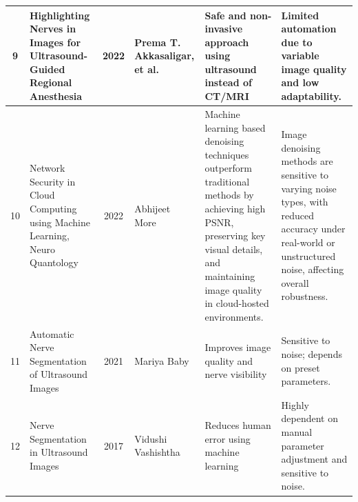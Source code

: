 \documentclass[12pt]{article}
\begin{document}
\begin{longtable}{|c|p{5cm}|c|p{2.5cm}|p{2cm}|p{3cm}|}
\hline
9 & Highlighting Nerves in Images for Ultrasound-Guided Regional Anesthesia & 2022 & Prema T. Akkasaligar, et al. & Safe and non-invasive approach using ultrasound instead of CT/MRI & Limited automation due to variable image quality and low adaptability. \\
\hline
10 & Network Security in Cloud Computing using Machine Learning, Neuro Quantology & 2022 & Abhijeet More & Machine learning based denoising techniques outperform traditional methods by achieving high PSNR, preserving key visual details, and maintaining image quality in cloud-hosted environments.& Image denoising methods are sensitive to varying noise types, with reduced accuracy under real-world or unstructured noise, affecting overall robustness.\\
\hline
11 & Automatic Nerve Segmentation of Ultrasound Images & 2021 & Mariya Baby & Improves image quality and nerve visibility & Sensitive to noise; depends on preset parameters. \\
\hline
12 & Nerve Segmentation in Ultrasound Images & 2017 & Vidushi Vashishtha & Reduces human error using machine learning & Highly dependent on manual parameter adjustment and sensitive to noise. \\
\hline

\end{longtable}


\begin{center}
\end{center}
\newpage
\end{document}
